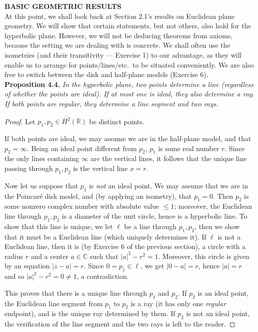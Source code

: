 \documentclass[leqno]{book}
\begin{document}
\noindent\textbf{BASIC GEOMETRIC RESULTS}\\

\noindent At this point, we shall look back at Section 2.1's results on Euclidean plane geometry.  We will show that certain statements, but not others, also hold for the hyperbolic plane.  However, we will not be deducing theorems from axioms, because the setting we are dealing with is concrete.  We shall often use the isometries (and their transitivity \---- Exercise 1) to our advantage, as they will enable us to arrange for points/lines/etc.~to be situated conveniently.  We are also free to switch between the disk and half-plane models (Exercise 6).\\

\noindent\textbf{Proposition 4.4.} \emph{In the hyperbolic plane, two points determine a line (regardless of whether the points are ideal).  If at most one is ideal, they also determine a ray.  If both points are regular, they determine a line segment and two rays.}
\begin{proof}
Let $p_1,p_2\in\overline{H^2}(\mathbb R)$ be distinct points.

If both points are ideal, we may assume we are in the half-plane model, and that $p_2=\infty$.  Being an ideal point different from $p_2$, $p_1$ is some real number $r$.  Since the only lines containing $\infty$ are the vertical lines, it follows that the unique line passing through $p_1,p_2$ is the vertical line $x=r$.

Now let us suppose that $p_1$ is \emph{not} an ideal point.  We may assume that we are in the Poincar\'e disk model, and (by applying an isometry), that $p_1=0$.  Then $p_2$ is some nonzero complex number with absolute value $\leqslant 1$; moreover, the Euclidean line through $p_1,p_2$ is a diameter of the unit circle, hence is a hyperbolic line.  To show that this line is unique, we let $\ell$ be a line through $p_1,p_2$, then we show that it must be a Euclidean line (which uniquely determines it).  If $\ell$ is not a Euclidean line, then it is (by Exercise 6 of the previous section), a circle with a radius $r$ and a center $a\in\mathbb C$ such that $|a|^2-r^2=1$.  Moreover, this circle is given by an equation $|z-a|=r$.  Since $0=p_1\in\ell$, we get $|0-a|=r$, hence $|a|=r$ and so $|a|^2-r^2=0\ne 1$, a contradiction.

This proves that there is a unique line through $p_1$ and $p_2$.  If $p_2$ is an ideal point, the Euclidean line segment from $p_1$ to $p_2$ is a ray (it has only one \emph{regular} endpoint), and is the unique ray determined by them.  If $p_2$ is not an ideal point, the verification of the line segment and the two rays is left to the reader.
\end{proof}
\end{document}
